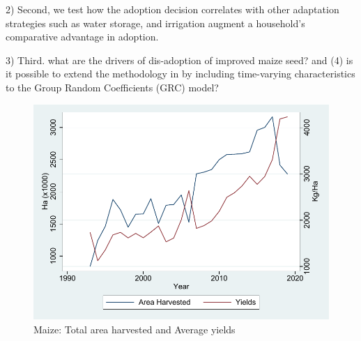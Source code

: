 \documentclass{article}
\begin{document}
2) Second, we test how the adoption decision correlates with other adaptation strategies such as water storage, and irrigation augment a household’s comparative advantage in adoption.

3) Third. what are the drivers of dis-adoption of improved maize seed? and (4) is it possible to extend the methodology in \citep{Tjernstrom_Emilia_Dalia_Ghanem_Oscar_Barriga_Cabanillas_Travis_J_Lybbert_Jeffrey_D_Michler_and_Aleksandr_Michuda2020-bc} by including time-varying characteristics to the Group Random Coefficients (GRC) model?






\begin{figure}[H]
    \centering
    \includegraphics{results/figures/Maize_yields.pdf}
    \caption{Maize: Total area harvested and Average yields}
    \label{fig:maize_yields}
\end{figure}
\end{document}
